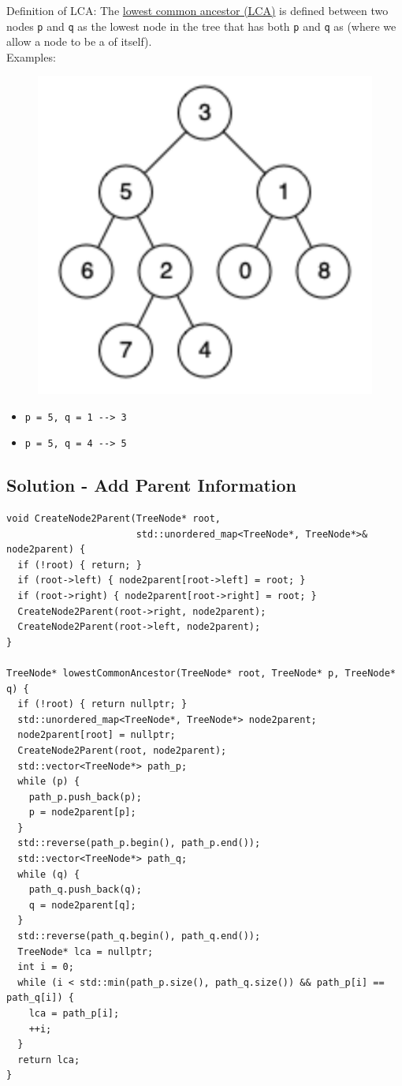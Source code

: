 Definition of LCA: The \ul{lowest common ancestor (LCA)} is defined between two nodes {\colorbox{CodeBackground}{\lstinline|p|}} and {\colorbox{CodeBackground}{\lstinline|q|}} as the lowest node in the tree that has both {\colorbox{CodeBackground}{\lstinline|p|}} and {\colorbox{CodeBackground}{\lstinline|q|}} as {\color{blue}{descendants}} (where we allow a node to be a {\color{blue}{descendant}} of itself). \\

Examples:
\begin{figure}[H]
	\centering
	\includegraphics[width=0.3\linewidth]{images/lc0236_example_1}
	\label{fig:lc0236example1}
\end{figure}
\begin{itemize}
	\item {\colorbox{CodeBackground}{\lstinline|p = 5, q = 1 --> 3|}}
	\item {\colorbox{CodeBackground}{\lstinline|p = 5, q = 4 --> 5|}}
\end{itemize}

\subsection*{Solution - Add Parent Information}
\begin{lstlisting}
void CreateNode2Parent(TreeNode* root,
                       std::unordered_map<TreeNode*, TreeNode*>& node2parent) {
  if (!root) { return; }
  if (root->left) { node2parent[root->left] = root; }
  if (root->right) { node2parent[root->right] = root; }
  CreateNode2Parent(root->right, node2parent);
  CreateNode2Parent(root->left, node2parent);
}

TreeNode* lowestCommonAncestor(TreeNode* root, TreeNode* p, TreeNode* q) {
  if (!root) { return nullptr; }
  std::unordered_map<TreeNode*, TreeNode*> node2parent;
  node2parent[root] = nullptr;
  CreateNode2Parent(root, node2parent);
  std::vector<TreeNode*> path_p;
  while (p) {
    path_p.push_back(p);
    p = node2parent[p];
  }
  std::reverse(path_p.begin(), path_p.end());
  std::vector<TreeNode*> path_q;
  while (q) {
    path_q.push_back(q);
    q = node2parent[q];
  }
  std::reverse(path_q.begin(), path_q.end());
  TreeNode* lca = nullptr;
  int i = 0;
  while (i < std::min(path_p.size(), path_q.size()) && path_p[i] == path_q[i]) {
    lca = path_p[i];
    ++i;
  }
  return lca;
}
\end{lstlisting}

